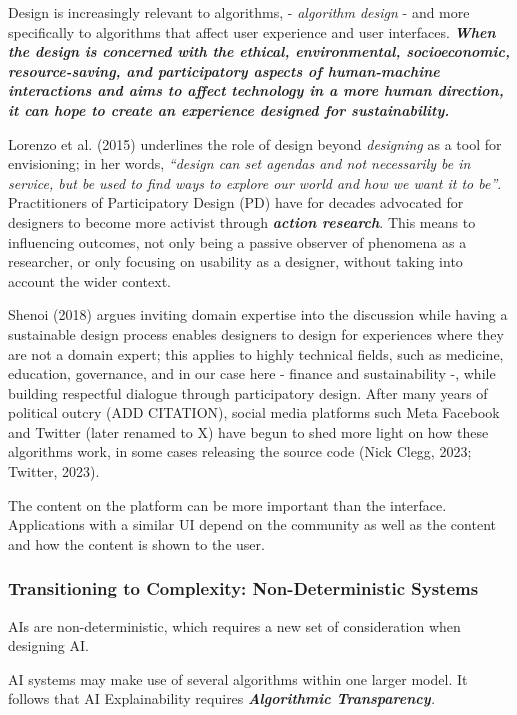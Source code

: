 \documentclass[
  letterpaper,
  DIV=11,
  numbers=noendperiod]{scrartcl}
\begin{document}
Design is increasingly relevant to algorithms, - \emph{algorithm design}
- and more specifically to algorithms that affect user experience and
user interfaces. \textbf{\emph{When the design is concerned with the
ethical, environmental, socioeconomic, resource-saving, and
participatory aspects of human-machine interactions and aims to affect
technology in a more human direction, it can hope to create an
experience designed for sustainability.}}

Lorenzo et al. (2015) underlines the role of design beyond
\emph{designing} as a tool for envisioning; in her words, \emph{``design
can set agendas and not necessarily be in service, but be used to find
ways to explore our world and how we want it to be''}. Practitioners of
Participatory Design (PD) have for decades advocated for designers to
become more activist through \textbf{\emph{action research}}. This means
to influencing outcomes, not only being a passive observer of phenomena
as a researcher, or only focusing on usability as a designer, without
taking into account the wider context.

Shenoi (2018) argues inviting domain expertise into the discussion while
having a sustainable design process enables designers to design for
experiences where they are not a domain expert; this applies to highly
technical fields, such as medicine, education, governance, and in our
case here - finance and sustainability -, while building respectful
dialogue through participatory design. After many years of political
outcry (ADD CITATION), social media platforms such Meta Facebook and
Twitter (later renamed to X) have begun to shed more light on how these
algorithms work, in some cases releasing the source code (Nick Clegg,
2023; Twitter, 2023).

The content on the platform can be more important than the interface.
Applications with a similar UI depend on the community as well as the
content and how the content is shown to the user.

\subsubsection{Transitioning to Complexity: Non-Deterministic
Systems}\label{transitioning-to-complexity-non-deterministic-systems}

AIs are non-deterministic, which requires a new set of consideration
when designing AI.

AI systems may make use of several algorithms within one larger model.
It follows that AI Explainability requires \emph{\textbf{Algorithmic
Transparency}.}
\end{document}
